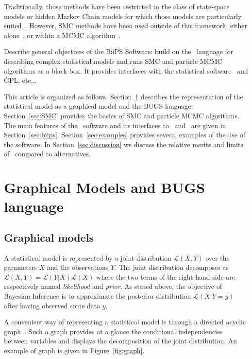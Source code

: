 \documentclass[article,shortnames]{jss}
\newcommand{\BiiPS}{\pkg{BiiPS}}
\newcommand{\BUGS}{\proglang{BUGS}}
\newcommand{\R}{\proglang{R}}
\newcommand{\Matlab}{\proglang{Matlab}}
\begin{document}
Traditionally, those methods have been restricted to the class of state-space models or hidden Markov Chain models for which those models are particularly suited~\citep{Cappe2005}. However, SMC methods have been used outside of this framework, either alone~\citep{Fearnhead2004,Fearnhead2007,Caron2008,Caron2012}, or within a MCMC algorithm~\citep{Andrieu2010}.

Describe general objectives of the BiiPS Software: build on the \BUGS\ language for describing complex statistical models and runs SMC and particle MCMC algorithms as a black box. It provides interfaces with the statistical software \R\ and \Matlab\. GPL, etc...

This article is organized as follows. Section~\ref{sec:graphical} describes the representation of the statistical model as a graphical model and the BUGS language. Section~\ref{sec:SMC} provides the basics of SMC and particle MCMC algorithms. The main features of the \BiiPS\ software and its interfaces to \R\ and \Matlab\ are given in Section~\ref{sec:biips}. Section~\ref{sec:examples} provides several examples of the use of the software. In Section~\ref{sec:discussion} we discuss the relative merits and limits of \BiiPS\ compared to alternatives.

\section{Graphical Models and BUGS language}
\label{sec:graphical}

\subsection{Graphical models}
A statistical model is represented by a joint distribution $\mathcal{L}(X,Y)$ over the parameters $X$ and the observations $Y$. The joint distribution decomposes as $\mathcal{L}(X,Y)=\mathcal{L}(Y|X)\mathcal{L}(X)$ where the two terms of the right-hand side are respectively named \textit{likelihood} and \textit{prior}. As stated above, the objective of Bayesian Inference is to approximate the posterior distribution $\mathcal{L}(X|Y=y)$ after having observed some data $y$.

A convenient way of representing a statistical model is through a directed acyclic graph~\citep{Lauritzen1996,Green2003,Jordan2004}. Such a graph provides at a glance the conditional independencies between variables and displays the decomposition of the joint distribution. An example of graph is given in Figure~\ref{fig:graph}.
\end{document}
